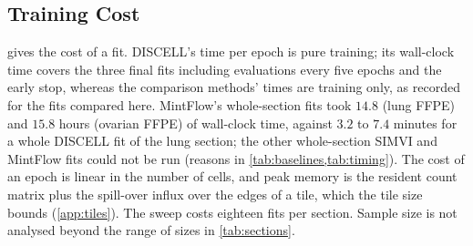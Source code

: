 \subsection{Training Cost}
\label{app:timing}

 gives the cost of a fit. DISCELL's time per epoch is pure training; its wall-clock time covers the three final fits including evaluations every five epochs and the early stop, whereas the comparison methods' times are training only, as recorded for the fits compared here. MintFlow's whole-section fits took $14.8$ (lung FFPE) and $15.8$ hours (ovarian FFPE) of wall-clock time, against $3.2$ to $7.4$ minutes for a whole DISCELL fit of the lung section; the other whole-section SIMVI and MintFlow fits could not be run (reasons in \cref{tab:baselines,tab:timing}). The cost of an epoch is linear in the number of cells, and peak memory is the resident count matrix plus the spill-over influx over the edges of a tile, which the tile size bounds (\cref{app:tiles}). The sweep costs eighteen fits per section. Sample size is not analysed beyond the range of sizes in \cref{tab:sections}.


